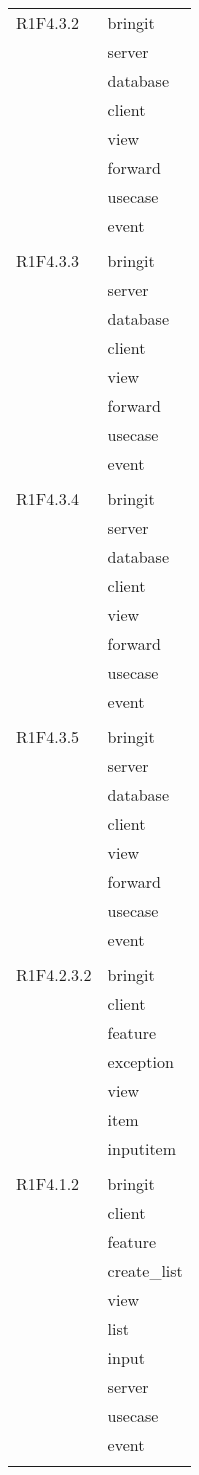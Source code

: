 \begin{center}
\begin{longtable}{|p{7cm}|p{7cm}|}
		R1F4.3.2 & bringit \\ & server \\ & database \\ & client \\ & view \\ & forward \\ & usecase \\ & event \\ & \\ \hline
		R1F4.3.3 & bringit \\ & server \\ & database \\ & client \\ & view \\ & forward \\ & usecase \\ & event \\ & \\ \hline
		R1F4.3.4 & bringit \\ & server \\ & database \\ & client \\ & view \\ & forward \\ & usecase \\ & event \\ & \\ \hline
		R1F4.3.5 & bringit \\ & server \\ & database \\ & client \\ & view \\ & forward \\ & usecase \\ & event \\ & \\ \hline
		R1F4.2.3.2 & bringit \\ & client \\ & feature \\ & exception \\ & view \\ & item \\ & inputitem \\ & \\ \hline
		R1F4.1.2 & bringit \\ & client \\ & feature \\ & create\_list \\ & view \\ & list \\ & input \\ & server \\ & usecase \\ & event \\ & \\ \hline

\end{longtable}
\end{center}
